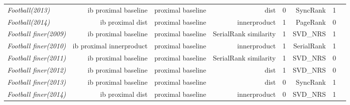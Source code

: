 \documentclass[nohyperref]{article}
\theoremstyle{plain}
\theoremstyle{definition}
\theoremstyle{remark}
\begin{document}
\begin{table*}[!ht]
{\begin{tabular}{lrrrrrrr}
			{\it Football(2013)} & ib proximal baseline & proximal baseline & dist & 0 & SyncRank & 1 \\
			{\it Football(2014)} & ib proximal dist & proximal baseline & innerproduct & 1 & PageRank & 0 \\
			{\it Football finer(2009)} & ib proximal baseline & proximal baseline & SerialRank similarity & 1 & SVD\_NRS & 1 \\
			{\it Football finer(2010)} & ib proximal innerproduct & proximal baseline & innerproduct & 1 & SerialRank & 1 \\
			{\it Football finer(2011)} & ib proximal baseline & proximal baseline & SerialRank similarity & 1 & SVD\_NRS & 0 \\
			{\it Football finer(2012)} & ib proximal baseline & proximal baseline & dist & 1 & SVD\_NRS & 0 \\
			{\it Football finer(2013)} & ib proximal baseline & proximal baseline & dist & 0 & SyncRank & 1 \\
			{\it Football finer(2014)} & ib proximal dist & proximal baseline & innerproduct & 0 & SVD\_NRS & 1 \\
    \bottomrule
    \end{tabular}}
\end{table*}
\end{document}
